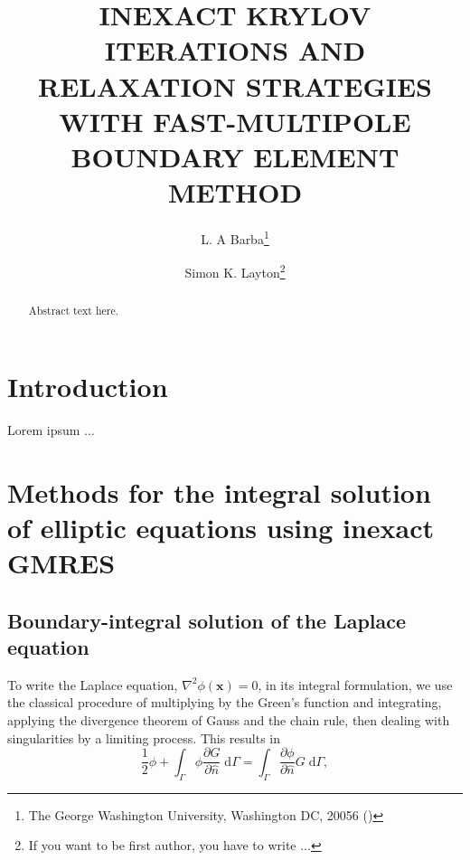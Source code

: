 \documentclass[final,leqno,]{siamltex1213}
\title{INEXACT KRYLOV ITERATIONS AND RELAXATION STRATEGIES WITH FAST-MULTIPOLE BOUNDARY ELEMENT METHOD}
\author{L. A Barba\thanks{The George Washington University, Washington DC, 20056 
(\email{labarba@gwu.edu})}
\and Simon K. Layton\thanks{If you want to be first author, you have to write ...}}
\newcommand{\di}[1]{\text{d}#1}
\newcommand{\partiald}[2]{\frac{\partial #1}{\partial #2}}
\newcommand{\nhat}{\hat{n}}
\newcommand{\vect}[1]{\mathbf{#1}}
\begin{document}
\maketitle

\begin{abstract}
Abstract text here.
\end{abstract}

\begin{keywords}\end{keywords}

\begin{AMS}\end{AMS}


\pagestyle{myheadings}
\thispagestyle{plain}

\section{Introduction}

Lorem ipsum ...


\section{Methods for the integral solution of elliptic equations using inexact {\small GMRES}}

\subsection{Boundary-integral solution of the Laplace equation}

To write the Laplace equation, $\nabla^{2}\phi(\vect{x}) = 0$,  in its integral formulation, we use the classical procedure of multiplying by the Green's function and integrating, applying the divergence theorem of Gauss and the chain rule, then dealing with singularities by a limiting process. This results in
%
\begin{equation}\label{eqn:laplace_bem_final}
	\frac{1}{2}\phi + \int_{\Gamma} \phi\partiald{G}{\nhat}\;\di{\Gamma} = \int_{\Gamma}\partiald{\phi}{\nhat}G\;\di{\Gamma},
\end{equation}
\end{document}

